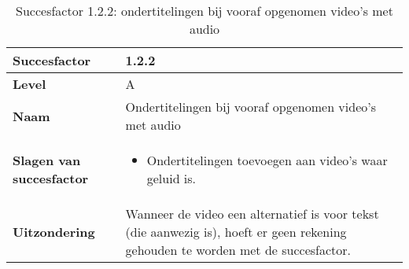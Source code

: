 \begin{table}[H]
    \centering
        \caption{Succesfactor 1.2.2: ondertitelingen bij vooraf opgenomen video’s met audio}
    \hspace*{-1cm}\begin{tabular}{|l|p{12cm}|} 
        \hline
        \textbf{Succesfactor}                & 1.2.2                                                                                                                                                                                                                                                                                                             \\ 
        \hline
        \textbf{Level}                       & A                                                                                                                                                                                                                                                                                                                                                                             \\ 
        \hline
        \textbf{Naam}                        & Ondertitelingen bij vooraf opgenomen video’s met audio~                                                                                                                                                                                                                                                                                                                                                            \\ 
        \hline
        \textbf{Slagen van succesfactor}     & \begin{itemize}
            \item Ondertitelingen toevoegen aan video’s waar geluid is.
        \end{itemize}                                                                                                                                                                                                      \\ 
        \hline
        \textbf{Uitzondering}     & Wanneer de video een alternatief is voor tekst (die aanwezig is), hoeft er geen rekening gehouden te worden met de succesfactor.
                                                                                                                                                                                                      \\ 

\end{tabular}
\end{table}
